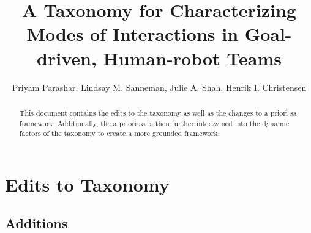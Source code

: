 \documentclass[letterpaper, 10 pt, conference]{ieeeconf} %
\title{\LARGE \bf A Taxonomy for Characterizing Modes of Interactions in
  Goal-driven, Human-robot Teams }
\author{ Priyam Parashar, Lindsay M. Sanneman, Julie A. Shah, Henrik I.
  Christensen }
\theoremstyle{definition} \newtheorem{definition}{Definition}
\begin{document}
\maketitle
\thispagestyle{empty} \pagestyle{empty}


\begin{abstract}
  This document contains the edits to the taxonomy as well as the changes to a
  priori sa framework. Additionally, the a priori sa is then further intertwined
  into the dynamic factors of the taxonomy to create a more grounded framework.
\end{abstract}



\section{Edits to Taxonomy}

\subsection{Additions}
\end{document}
